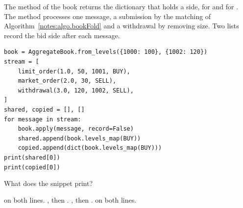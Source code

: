 \begin{question}
\label{question.recorderAliasesTheSide}
The method  of the book returns the dictionary that holds a side,
 for  and  for .
The method  processes one message,
a submission by the matching of Algorithm~\ref{notes:algo.bookFold}
and a withdrawal by removing size.
Two lists record the bid side after each message.
\begin{lstlisting}[caption={Two records of the bid side}, label=listing.recorderAliases]
book = AggregateBook.from_levels({1000: 100}, {1002: 120})
stream = [
    limit_order(1.0, 50, 1001, BUY),
    market_order(2.0, 30, SELL),
    withdrawal(3.0, 120, 1002, SELL),
]
shared, copied = [], []
for message in stream:
    book.apply(message, record=False)
    shared.append(book.levels_map(BUY))
    copied.append(dict(book.levels_map(BUY)))
print(shared[0])
print(copied[0])
\end{lstlisting}
What does the snippet print?
\begin{choices}
 \choice {} on both lines.
 \choice {}, then .
 \correctchoice {}, then .
 \choice {} on both lines.
\end{choices}
\end{question}

